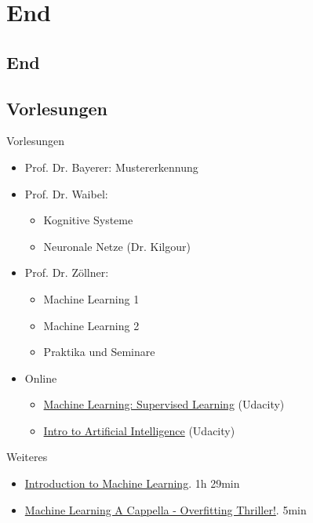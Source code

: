 \section*{End}
\subsection*{End}

\subsection{Vorlesungen}
\begin{frame}{Vorlesungen}
    \begin{itemize}
        \item Prof. Dr. Bayerer: Mustererkennung
        \item Prof. Dr. Waibel:
        \begin{itemize}
            \item Kognitive Systeme
            \item Neuronale Netze (Dr. Kilgour)
        \end{itemize}
        \item Prof. Dr. Zöllner:
        \begin{itemize}
            \item Machine Learning 1
            \item Machine Learning 2
            \item Praktika und Seminare
        \end{itemize}
        \item Online
        \begin{itemize}
            \item \href{https://www.udacity.com/course/machine-learning-supervised-learning--ud675}{Machine Learning: Supervised Learning} (Udacity)
            \item \href{https://www.udacity.com/course/intro-to-artificial-intelligence--cs271}{Intro to Artificial Intelligence} (Udacity)
        \end{itemize}
    \end{itemize}
\end{frame}

\begin{frame}{Weiteres}
    \begin{itemize}
        \item \href{http://videolectures.net/deeplearning2015_vincent_machine_learning/}{Introduction to Machine Learning}. 1h 29min
        \item \href{https://www.youtu.be.com/watch?v=DQWI1kvmwRg}{Machine Learning A Cappella - Overfitting Thriller!}. 5min
    \end{itemize}
\end{frame}

